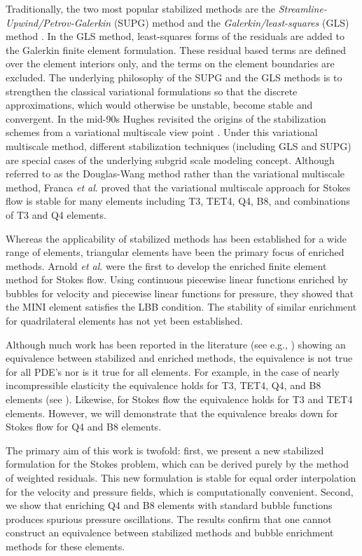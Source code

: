 \documentclass[11pt]{amsart}
\begin{document}
Traditionally, the two most popular stabilized methods are the \emph{Streamline-Upwind/Petrov-Galerkin} (SUPG) method \cite{SUPG} and the \emph{Galerkin/least-squares} (GLS) method \cite{GLS}. In the GLS method, least-squares forms of the residuals are added to the Galerkin finite element formulation. These residual based terms are defined over the element interiors only, and the terms on the element boundaries are excluded. The underlying philosophy of the SUPG and the GLS methods is to strengthen the classical variational formulations so that the discrete approximations, which would otherwise be unstable, become stable and convergent. In the mid-90s Hughes revisited the origins of the stabilization schemes from a variational multiscale view point \cite{Hughes2}. Under this variational multiscale method, different stabilization techniques (including GLS and SUPG) are special cases of the underlying subgrid scale modeling concept.  Although referred to as the Douglas-Wang method \cite{Douglas} rather than the variational multiscale method, Franca \textit{et al}. \cite{Franca} proved that the variational multiscale approach for Stokes flow is stable for many elements including T3, TET4, Q4, B8, and combinations of T3 and Q4 elements.

Whereas the applicability of stabilized methods has been established for a wide range of elements, triangular elements have been the primary focus of enriched methods.  Arnold \textit{et al}. \cite{Arnold} were the first to develop the enriched finite element method for Stokes flow.  Using continuous piecewise linear functions enriched by bubbles for velocity and piecewise linear functions for pressure, they showed that the MINI element satisfies the LBB condition.  The stability of similar enrichment for quadrilateral elements has not yet been established.  

Although much work has been reported in the literature (see e.g., \cite{Baiocchi, Brezzi2, Brezzi3, Russo}) showing an equivalence between stabilized and enriched methods, the equivalence is not true for all PDE's nor is it true for all elements.  For example, in the case of nearly incompressible elasticity the equivalence holds for T3, TET4, Q4, and B8 elements (see \cite{Nakshatrala}).  Likewise, for Stokes flow the equivalence holds for T3 and TET4 elements.  However, we will demonstrate that the equivalence breaks down for Stokes flow for Q4 and B8 elements.



The primary aim of this work is twofold: first, we present a new stabilized formulation for the Stokes problem, which can be derived purely by the method of weighted residuals.  This new formulation is stable for equal order interpolation for the velocity and pressure fields, which is computationally convenient.  Second, we show that enriching Q4 and B8 elements with standard bubble functions produces spurious pressure oscillations. The results confirm that one cannot construct an equivalence between stabilized methods and bubble enrichment methods for these elements.
\end{document}
